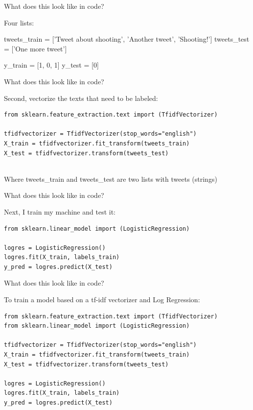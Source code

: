 \documentclass[compress]{beamer}
\begin{document}
\begin{frame}[fragile]{What does this look like in code?}
	
Four lists: 
	
\begin{lstlistingoutput}

tweets\_train = ['Tweet about shooting', 'Another tweet', 'Shooting!']
tweets\_test = ['One more tweet']

y\_train = [1, 0, 1]	
y\_test = [0]	

\end{lstlistingoutput}
\end{frame}



\begin{frame}[fragile]{What does this look like in code?}
	
Second, vectorize the texts that need to be labeled: 
	
\begin{lstlisting}
from sklearn.feature_extraction.text import (TfidfVectorizer)
		
tfidfvectorizer = TfidfVectorizer(stop_words="english")
X_train = tfidfvectorizer.fit_transform(tweets_train)
X_test = tfidfvectorizer.transform(tweets_test)
		
\end{lstlisting}
	
Where tweets\_train and tweets\_test are two lists with tweets (strings)
	
\end{frame}


\begin{frame}[fragile]{What does this look like in code?}
	
Next, I train my machine and test it: 
	
\begin{lstlisting}
from sklearn.linear_model import (LogisticRegression)
		
logres = LogisticRegression()
logres.fit(X_train, labels_train)
y_pred = logres.predict(X_test)
\end{lstlisting}
\end{frame}


\begin{frame}[fragile]{What does this look like in code?}
	
To train a model based on a tf-idf vectorizer and Log Regression:
	
\begin{lstlisting}
from sklearn.feature_extraction.text import (TfidfVectorizer)
from sklearn.linear_model import (LogisticRegression)
		
tfidfvectorizer = TfidfVectorizer(stop_words="english")
X_train = tfidfvectorizer.fit_transform(tweets_train)
X_test = tfidfvectorizer.transform(tweets_test)
		
logres = LogisticRegression()
logres.fit(X_train, labels_train)
y_pred = logres.predict(X_test)
\end{lstlisting}
	
\end{frame}
\end{document}
